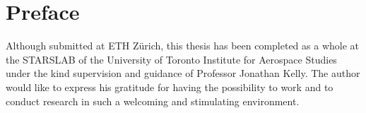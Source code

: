 \chapter*{Preface}

Although submitted at ETH Zürich, this thesis has been completed as a whole at the STARSLAB of the University of Toronto Institute for Aerospace Studies under the kind supervision and guidance of Professor Jonathan Kelly. The author would like to express his gratitude for having the possibility to work and to conduct research in such a welcoming and stimulating environment.